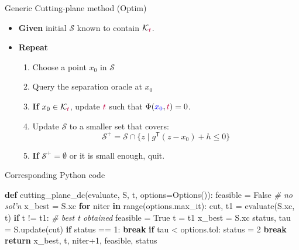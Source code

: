 \documentclass[10pt,ignorenonframetext,serif,onlymath]{beamer}
\newenvironment{Shaded}{}{}
\newcommand{\BuiltInTok}[1]{#1}
\newcommand{\CommentTok}[1]{\textcolor[rgb]{0.38,0.63,0.69}{\textit{#1}}}
\newcommand{\ControlFlowTok}[1]{\textcolor[rgb]{0.00,0.44,0.13}{\textbf{#1}}}
\newcommand{\DecValTok}[1]{\textcolor[rgb]{0.25,0.63,0.44}{#1}}
\newcommand{\KeywordTok}[1]{\textcolor[rgb]{0.00,0.44,0.13}{\textbf{#1}}}
\newcommand{\NormalTok}[1]{#1}
\newcommand{\OperatorTok}[1]{\textcolor[rgb]{0.40,0.40,0.40}{#1}}
\newcommand{\VariableTok}[1]{\textcolor[rgb]{0.10,0.09,0.49}{#1}}
\providecommand{\tightlist}{%
  \setlength{\itemsep}{0pt}\setlength{\parskip}{0pt}}
\begin{document}
\begin{frame}{Generic Cutting-plane method (Optim)}
\protect\hypertarget{generic-cutting-plane-method-optim}{}

\begin{itemize}
\tightlist
\item
  \textbf{Given} initial \(\mathcal{S}\) known to contain
  \(\mathcal{K}_{\color{purple}t}\).
\item
  \textbf{Repeat}

  \begin{enumerate}
  [1.]
  \tightlist
  \item
    Choose a point \(x_0\) in \(\mathcal{S}\)
  \item
    Query the separation oracle at \(x_0\)
  \item
    \textbf{If} \(x_0 \in \mathcal{K}_{\color{purple}t}\), update
    \({\color{purple}t}\) such that
    \(\Phi({\color{blue}x_0}, {\color{purple}t}) = 0\).
  \item
    Update \(\mathcal{S}\) to a smaller set that covers:
    \[\mathcal{S}^+ = \mathcal{S} \cap \{z \mid g^\mathsf{T} (z - x_0) + h \leq 0\} \]
  \item
    \textbf{If} \(\mathcal{S}^+ = \emptyset\) or it is small enough,
    quit.
  \end{enumerate}
\end{itemize}

\end{frame}

\begin{frame}[fragile]{Corresponding Python code}
\protect\hypertarget{corresponding-python-code-2}{}

\begin{Shaded}
\begin{Highlighting}[]
\KeywordTok{def}\NormalTok{ cutting_plane_dc(evaluate, S, t, options}\OperatorTok{=}\NormalTok{Options()):}
\NormalTok{    feasible }\OperatorTok{=} \VariableTok{False}  \CommentTok{# no sol'n}
\NormalTok{    x_best }\OperatorTok{=}\NormalTok{ S.xc}
    \ControlFlowTok{for}\NormalTok{ niter }\KeywordTok{in} \BuiltInTok{range}\NormalTok{(options.max_it):}
\NormalTok{        cut, t1 }\OperatorTok{=}\NormalTok{ evaluate(S.xc, t)}
        \ControlFlowTok{if}\NormalTok{ t }\OperatorTok{!=}\NormalTok{ t1:  }\CommentTok{# best t obtained}
\NormalTok{            feasible }\OperatorTok{=} \VariableTok{True}
\NormalTok{            t }\OperatorTok{=}\NormalTok{ t1}
\NormalTok{            x_best }\OperatorTok{=}\NormalTok{ S.xc}
\NormalTok{        status, tau }\OperatorTok{=}\NormalTok{ S.update(cut)}
        \ControlFlowTok{if}\NormalTok{ status }\OperatorTok{==} \DecValTok{1}\NormalTok{:}
            \ControlFlowTok{break}
        \ControlFlowTok{if}\NormalTok{ tau }\OperatorTok{<}\NormalTok{ options.tol:}
\NormalTok{            status }\OperatorTok{=} \DecValTok{2}
            \ControlFlowTok{break}
    \ControlFlowTok{return}\NormalTok{ x_best, t, niter}\OperatorTok{+}\DecValTok{1}\NormalTok{, feasible, status}
\end{Highlighting}
\end{Shaded}

\end{frame}
\end{document}
